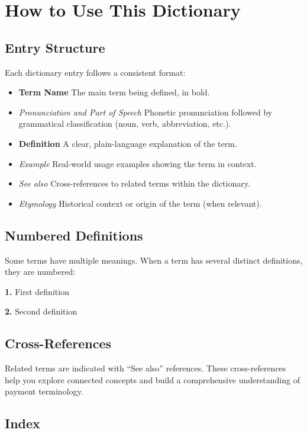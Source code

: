 \chapter*{How to Use This Dictionary}

\section*{Entry Structure}

Each dictionary entry follows a consistent format:

\begin{itemize}[leftmargin=2cm]
    \item \textbf{Term Name} The main term being defined, in bold.
    \item \textit{Pronunciation and Part of Speech} Phonetic pronunciation followed by grammatical classification (noun, verb, abbreviation, etc.).
    \item \textbf{Definition} A clear, plain-language explanation of the term.
    \item \textit{Example} Real-world usage examples showing the term in context.
    \item \textit{See also} Cross-references to related terms within the dictionary.
    \item \textit{Etymology} Historical context or origin of the term (when relevant).
\end{itemize}

\section*{Numbered Definitions}

Some terms have multiple meanings. When a term has several distinct definitions, they are numbered:

\textbf{1.} First definition

\textbf{2.} Second definition

\section*{Cross-References}

Related terms are indicated with ``See also'' references. These cross-references help you explore connected concepts and build a comprehensive understanding of payment terminology.

\section*{Index}

